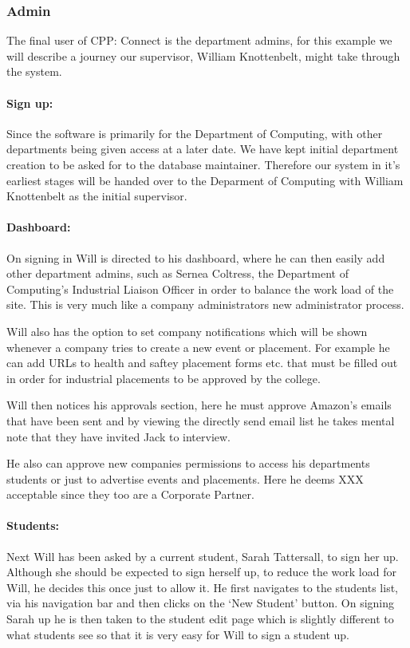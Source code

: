 \subsubsection{Admin}
  The final user of CPP: Connect is the department admins, for this example we will describe a journey our supervisor, William Knottenbelt, might take through the system.
  \paragraph{Sign up:}
    Since the software is primarily for the Department of Computing, with other departments being given access at a later date. We have kept initial department creation to be asked for to the database maintainer. 
    Therefore our system in it's earliest stages will be handed over to the Deparment of Computing with William Knottenbelt as the initial supervisor. 

  \paragraph{Dashboard:}
    On signing in Will is directed to his dashboard, where he can then easily add other department admins, such as Sernea Coltress, the Department of Computing's Industrial Liaison Officer in order to balance the work load of the site. This is very much like a company administrators new administrator process.


    Will also has the option to set company notifications which will be shown whenever a company tries to create a new event or placement. For example he can add URLs to health and saftey placement forms etc. that must be filled out in order for industrial placements to be approved by the college. 

    Will then notices his approvals section, here he must approve Amazon's emails that have been sent and by viewing the directly send email list he takes mental note that they have invited Jack to interview. 

    He also can approve new companies permissions to access his departments students or just to advertise events and placements. Here he deems XXX acceptable since they too are a Corporate Partner.

  \paragraph{Students:}
    Next Will has been asked by a current student, Sarah Tattersall, to sign her up. Although she should be expected to sign herself up, to reduce the work load for Will, he decides this once just to allow it.
    He first navigates to the students list, via his navigation bar and then clicks on the `New Student' button.
    On signing Sarah up he is then taken to the student edit page which is slightly different to what students see so that it is very easy for Will to sign a student up.

